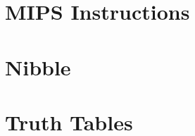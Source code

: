 \documentclass{article}
\begin{document}
\thispagestyle{empty}

\null
\vfill

\begin{minipage}[t]{\linewidth}
    \section*{MIPS Instructions}
    
\end{minipage}

\vfill

\vfill

\begin{minipage}[t]{0.3\linewidth}
    \section*{Nibble}
    \centering
    
\end{minipage}
\hfill
\begin{minipage}[t]{0.68\linewidth}
    \section*{Truth Tables}
    
\end{minipage}

\vfill
\end{document}
